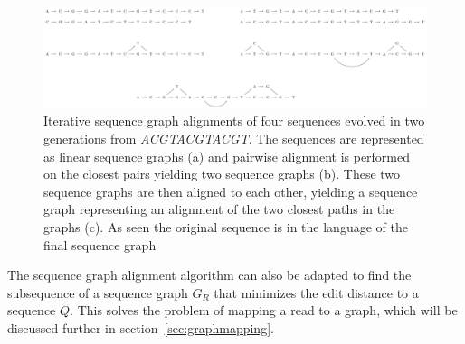 \begin{figure}
  \includegraphics[width=\textwidth,height=\textheight,keepaspectratio]{figures/graph_msa}
  \caption{Iterative sequence graph alignments of four sequences evolved in two generations from \emph{ACGTACGTACGT}.
    The sequences are represented as linear sequence graphs (a) and pairwise alignment is performed on the closest pairs yielding two sequence graphs (b). These two sequence graphs are then aligned to each other, yielding a sequence graph representing an alignment of the two closest paths in the graphs (c). As seen the original sequence is in the language of the final sequence graph}
  \label{fig:treealign}
\end{figure}

The sequence graph alignment algorithm can also be adapted to find the subsequence of a sequence graph $G_R$ that minimizes the edit distance to a sequence $Q$. This solves the problem of mapping a read to a graph, which will be discussed further in section~\ref{sec:graphmapping}.



